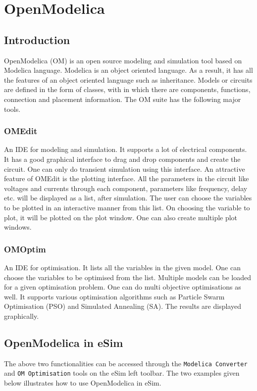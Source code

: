 \chapter{OpenModelica}
\thispagestyle{empty}
\label{chap11}

\section {Introduction}
OpenModelica (OM) is an open source modeling and simulation tool based on
Modelica language. Modelica is an object oriented language. As a result, it has all the
features of an object oriented language such as inheritance. Models or circuits are
defined in the form of classes, with in which there are components, functions,
connection and placement information. The OM suite has the following major tools.

\subsection {OMEdit}
An IDE for modeling and simulation. It supports a lot of electrical components. It
has a good graphical interface to drag and drop components and create the circuit.
One can only do transient simulation using this interface. An attractive feature of
OMEdit is the plotting interface. All the parameters in the circuit like voltages and currents through each component,
parameters like frequency, delay etc. will be displayed as
a list, after simulation. The user can choose the variables to be plotted in an
interactive manner from this list. On choosing the variable to plot, it will be plotted
on the plot window. One can also create multiple plot windows.

\subsection {OMOptim}
An IDE for optimisation. It lists all the variables in the given model. One can choose
the variables to be optimised from the list. Multiple models can be loaded for a given
optimisation problem. One can do multi objective optimisations as well. It supports
various optimisation algorithms such as Particle Swarm Optimisation (PSO) and
Simulated Annealing (SA). The results are displayed graphically.

\section {OpenModelica in eSim}
The above two functionalities can be accessed through the {\tt Modelica Converter} and {\tt OM Optimisation} tools on the eSim left toolbar. The two examples given below illustrates how to use OpenModelica in eSim. 

